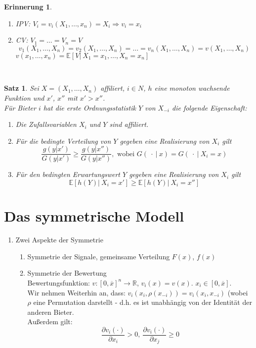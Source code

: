 \documentclass[12pt]{extreport} %
\newcommand{\R}{\mathbb{R}}
\theoremstyle{named}
\theoremstyle{itshape}
\newtheorem{satz}[unnamedtheorem]{Satz}
\theoremstyle{normal}
\newtheorem*{erinnerung}{Erinnerung}
\begin{document}
\begin{erinnerung} ~\
	\begin{enumerate}
		\item IPV: $V_{i} = v_{i}(X_1, \dotsc, x_{n}) = X_{i} \Rightarrow v_i = x_i$
		\item CV: $V_1 = \dotsc = V_n = V$
			$$v_1(X_1, \dotsc, X_n) = v_2(X_1, \dotsc, X_n) = \dotsc = v_n(X_1, \dotsc, X_n) = v(X_1, \dotsc, X_n)$$
			$v(x_1, \dotsc, x_n) = \mathbb{E}\left[ V |~X_1 = x_1, \dotsc, X_n = x_n \right]$
	\end{enumerate}		
\end{erinnerung}
~\newline
\begin{satz}
	Sei $X = (X_1, \dotsc, X_n)$ affiliert, $i \in N$, $h$ eine monoton wachsende Funktion und $x'$, $x''$ mit $x' > x''$. ~\\
	
	Für Bieter $i$ hat die erste Ordnungsstatistik $Y$ von $X_{-i}$ die folgende Eigenschaft:
	\begin{enumerate}
		\item Die Zufallsvariablen $X_{i}$ und $Y$ sind affiliert.
		\item Für die bedingte Verteilung von $Y$ gegeben eine Realisierung von $X_i$ gilt
			$$ \frac{g(y|x')}{G(y|x')} \geq \frac{g(y|x'')}{G(y|x'')}, \text{ wobei } G(~\cdot ~ | ~ x) = G(~\cdot ~ | ~ X_{i} = x) $$
		\item Für den bedingten Erwartungswert $Y$ gegeben eine Realisierung von $X_i$ gilt
			$$  \mathbb{E}\left[ h(Y) \big| ~ X_{i} = x' \right] \geq \mathbb{E}\left[ h(Y) \big| ~ X_{i} = x'' \right] $$
	\end{enumerate}
\end{satz}

\section{Das symmetrische Modell}

\begin{enumerate}[label=\alph*\upshape)]
	\item Zwei Aspekte der Symmetrie
		\begin{enumerate}[label=\arabic*.]
			\item Symmetrie der Signale, gemeinsame Verteilung $F(x)$, $f(x)$
			\item Symmetrie der Bewertung ~\\
				Bewertungsfunktion: $v \colon [0, \overline{x}]^{n} \rightarrow \R$, $v_{i}(x) = v(x)$. $x_{i} \in [0, \overline{x}]$. ~\\
				
				Wir nehmen Weiterhin an, dass: $v_{i}(x_{i}, \rho(x_{-i})) = v_{i}(x_{i}, x_{-i})$ (wobei $\rho$ eine Permutation darstellt - d.h. es ist unabhängig von der Identität der anderen Bieter. ~\\
				
				Außerdem gilt: 
				$$ \frac{\partial v_{i}(\cdot)}{\partial x_{i}} > 0, ~\frac{\partial v_{i}(\cdot)}{\partial x_{j}} \geq 0 $$		
		\end{enumerate}
\end{enumerate}
\end{document}
